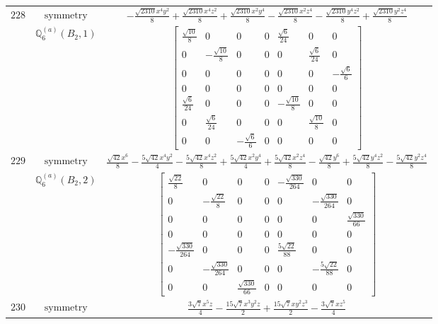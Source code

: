 \documentclass[fleqn,8pt,landscape]{jsarticle}
\begin{document}
\begin{longtable}{ccc}
$ 228 $ & $ \text{symmetry} $ & $ - \frac{\sqrt{2310} x^{4} y^{2}}{8} + \frac{\sqrt{2310} x^{4} z^{2}}{8} + \frac{\sqrt{2310} x^{2} y^{4}}{8} - \frac{\sqrt{2310} x^{2} z^{4}}{8} - \frac{\sqrt{2310} y^{4} z^{2}}{8} + \frac{\sqrt{2310} y^{2} z^{4}}{8} $ \\
$  $ & $ \mathbb{Q}_{6}^{(a)}(B_{2},1) $ & $ \begin{bmatrix} \frac{\sqrt{10}}{8} & 0 & 0 & 0 & \frac{\sqrt{6}}{24} & 0 & 0 \\ 0 & - \frac{\sqrt{10}}{8} & 0 & 0 & 0 & \frac{\sqrt{6}}{24} & 0 \\ 0 & 0 & 0 & 0 & 0 & 0 & - \frac{\sqrt{6}}{6} \\ 0 & 0 & 0 & 0 & 0 & 0 & 0 \\ \frac{\sqrt{6}}{24} & 0 & 0 & 0 & - \frac{\sqrt{10}}{8} & 0 & 0 \\ 0 & \frac{\sqrt{6}}{24} & 0 & 0 & 0 & \frac{\sqrt{10}}{8} & 0 \\ 0 & 0 & - \frac{\sqrt{6}}{6} & 0 & 0 & 0 & 0 \end{bmatrix} $ \\ \hline
$ 229 $ & $ \text{symmetry} $ & $ \frac{\sqrt{42} x^{6}}{8} - \frac{5 \sqrt{42} x^{4} y^{2}}{4} - \frac{5 \sqrt{42} x^{4} z^{2}}{8} + \frac{5 \sqrt{42} x^{2} y^{4}}{4} + \frac{5 \sqrt{42} x^{2} z^{4}}{8} - \frac{\sqrt{42} y^{6}}{8} + \frac{5 \sqrt{42} y^{4} z^{2}}{8} - \frac{5 \sqrt{42} y^{2} z^{4}}{8} $ \\
$  $ & $ \mathbb{Q}_{6}^{(a)}(B_{2},2) $ & $ \begin{bmatrix} \frac{\sqrt{22}}{8} & 0 & 0 & 0 & - \frac{\sqrt{330}}{264} & 0 & 0 \\ 0 & - \frac{\sqrt{22}}{8} & 0 & 0 & 0 & - \frac{\sqrt{330}}{264} & 0 \\ 0 & 0 & 0 & 0 & 0 & 0 & \frac{\sqrt{330}}{66} \\ 0 & 0 & 0 & 0 & 0 & 0 & 0 \\ - \frac{\sqrt{330}}{264} & 0 & 0 & 0 & \frac{5 \sqrt{22}}{88} & 0 & 0 \\ 0 & - \frac{\sqrt{330}}{264} & 0 & 0 & 0 & - \frac{5 \sqrt{22}}{88} & 0 \\ 0 & 0 & \frac{\sqrt{330}}{66} & 0 & 0 & 0 & 0 \end{bmatrix} $ \\ \hline
$ 230 $ & $ \text{symmetry} $ & $ \frac{3 \sqrt{7} x^{5} z}{4} - \frac{15 \sqrt{7} x^{3} y^{2} z}{2} + \frac{15 \sqrt{7} x y^{2} z^{3}}{2} - \frac{3 \sqrt{7} x z^{5}}{4} $ \\

\end{longtable}
\end{document}
